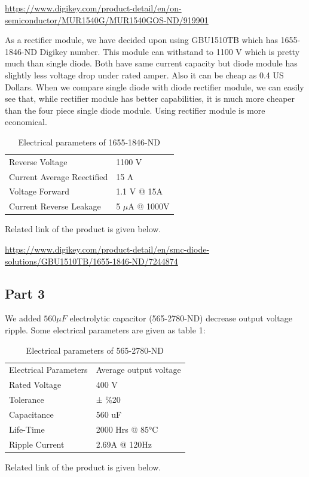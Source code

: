 \documentclass[fleqn, a4paper]{article}
\begin{document}
\url {https://www.digikey.com/product-detail/en/on-semiconductor/MUR1540G/MUR1540GOS-ND/919901}

As a rectifier module, we have decided upon using GBU1510TB which has 1655-1846-ND Digikey number. This module can withstand to 1100 V which is pretty much than single diode. Both have same current capacity but diode module has slightly less voltage drop under rated amper. Also it can be cheap as 0.4 US Dollars. When we compare single diode with diode rectifier module, we can easily see that, while rectifier module has better capabilities, it is much more cheaper than the four piece single diode module. Using rectifier module is more economical.

\begin{table}[H]
\centering
\begin{tabular}{ll}

Reverse Voltage                   & 1100 V               \\
Current Average Reectified        & 15 A                \\
Voltage Forward                   & 1.1 V @ 15A        \\
Current Reverse Leakage           & 5 $\mu$A  @ 1000V         
\end{tabular}
\caption{Electrical parameters of 1655-1846-ND}
\end{table}
Related link of the product is given below.

\url {https://www.digikey.com/product-detail/en/smc-diode-solutions/GBU1510TB/1655-1846-ND/7244874}

\subsection*{Part 3}
We added $560 \mu F $ electrolytic capacitor (565-2780-ND) decrease output voltage ripple. Some electrical parameters are given as table 1:
\begin{table}[H]
\centering
\begin{tabular}{ll}
Electrical Parameters & Average output voltage \\
Rated Voltage         & 400 V                  \\
Tolerance             & ± \%20                 \\
Capacitance           & 560 uF                 \\
Life-Time             & 2000 Hrs @ 85°C        \\
Ripple Current        & 2.69A @ 120Hz         
\end{tabular}
\caption{Electrical parameters of 565-2780-ND}

\end{table}
Related link of the product is given below.
\end{document}
